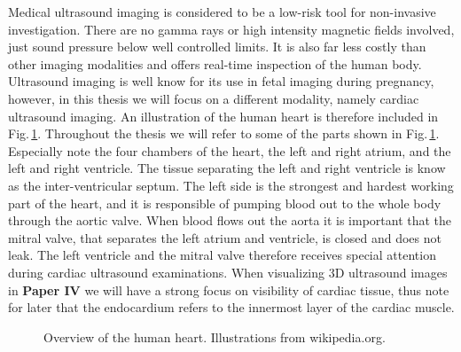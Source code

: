 Medical ultrasound imaging is considered to be a low-risk tool for non-invasive investigation. There are no gamma rays or high intensity magnetic fields involved, just sound pressure below well controlled limits. It is also far less costly than other imaging modalities and offers real-time inspection of the human body.  Ultrasound imaging is well know for its use in fetal imaging during pregnancy, however, in this thesis we will focus on a different modality, namely cardiac ultrasound imaging. An illustration of the human heart is therefore included in Fig.\,\ref{fig:human_heart}. Throughout the thesis we will refer to some of the parts shown in Fig.\,\ref{fig:human_heart}. Especially note the four chambers of the heart, the left and right atrium, and the left and right ventricle. The tissue separating the left and right ventricle is know as the inter-ventricular septum. The left side is the strongest and hardest working part of the heart, and it is responsible of pumping blood out to the whole body through the aortic valve. When blood flows out the aorta it is important that the mitral valve, that separates the left atrium and ventricle, is closed and does not leak. The left ventricle and the mitral valve therefore receives special attention during cardiac ultrasound examinations. When visualizing 3D ultrasound images in \textbf{Paper IV} we will have a strong focus on visibility of cardiac tissue, thus note for later that the endocardium refers to the innermost layer of the cardiac muscle.

\begin{figure}
\centering
{}
\caption{Overview of the human heart. Illustrations from wikipedia.org.}
\label{fig:human_heart}
\end{figure}


